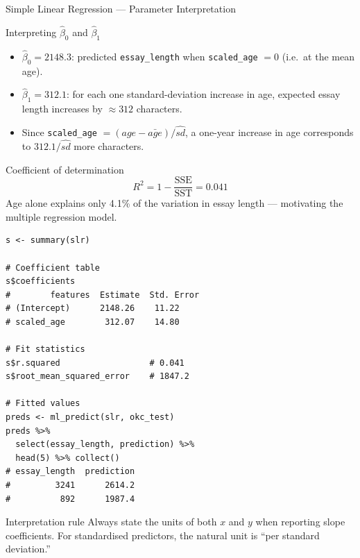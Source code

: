 \documentclass[11pt, aspectratio=169]{beamer}
\begin{document}
\begin{frame}{Simple Linear Regression --- Parameter Interpretation}
	\begin{block}{Interpreting $\hat\beta_0$ and $\hat\beta_1$}
				\begin{itemize}
					\item $\hat\beta_0 = 2148.3$: predicted \texttt{essay\_length} when
					\texttt{scaled\_age} $= 0$ (i.e.\ at the mean age).
					\item $\hat\beta_1 = 312.1$: for each one standard-deviation
					increase in age, expected essay length increases by
					$\approx 312$ characters.
					\item Since \texttt{scaled\_age} $= (age - \bar{age})/\widehat{sd}$,
					a one-year increase in age corresponds to
					$312.1 / \widehat{sd}$ more characters.
				\end{itemize}
			\end{block}
			\begin{block}{Coefficient of determination}
				\[
				R^2 = 1 - \frac{\mathrm{SSE}}{\mathrm{SST}} = 0.041
				\]
				Age alone explains only 4.1\% of the variation in essay
				length --- motivating the multiple regression model.
			\end{block}
		\begin{lstlisting}[title={Extracting coefficients \& R² (therinspark.com)}]
s <- summary(slr)

# Coefficient table
s$coefficients
#        features  Estimate  Std. Error
# (Intercept)      2148.26    11.22
# scaled_age        312.07    14.80

# Fit statistics
s$r.squared                  # 0.041
s$root_mean_squared_error    # 1847.2

# Fitted values
preds <- ml_predict(slr, okc_test)
preds %>%
  select(essay_length, prediction) %>%
  head(5) %>% collect()
# essay_length  prediction
#         3241      2614.2
#          892      1987.4
			\end{lstlisting}
			\begin{exampleblock}{Interpretation rule}
				Always state the units of both $x$ and $y$ when reporting
				slope coefficients.  For standardised predictors, the
				natural unit is ``per standard deviation.''
			\end{exampleblock}
		\end{frame}
\end{document}
